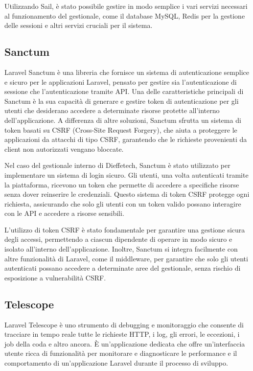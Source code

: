 Utilizzando Sail, è stato possibile gestire in modo semplice i vari servizi necessari al funzionamento del gestionale, come il database MySQL, Redis per la gestione delle sessioni e altri servizi cruciali per il sistema.
\subsection{Sanctum}\label{subsec:cap_sec_subsec_sanctum}
Laravel Sanctum è una libreria che fornisce un sistema di autenticazione semplice e sicuro per le applicazioni Laravel, pensato per gestire sia l’autenticazione di sessione che l’autenticazione tramite API. Una delle caratteristiche principali di Sanctum è la sua capacità di generare e gestire token di autenticazione per gli utenti che desiderano accedere a determinate risorse protette all’interno dell’applicazione. A differenza di altre soluzioni, Sanctum sfrutta un sistema di token basati su CSRF (Cross-Site Request Forgery), che aiuta a proteggere le applicazioni da attacchi di tipo CSRF, garantendo che le richieste provenienti da client non autorizzati vengano bloccate.

Nel caso del gestionale interno di Dieffetech, Sanctum è stato utilizzato per implementare un sistema di login sicuro. Gli utenti, una volta autenticati tramite la piattaforma, ricevono un token che permette di accedere a specifiche risorse senza dover reinserire le credenziali. Questo sistema di token CSRF protegge ogni richiesta, assicurando che solo gli utenti con un token valido possano interagire con le API e accedere a risorse sensibili.

L’utilizzo di token CSRF è stato fondamentale per garantire una gestione sicura degli accessi, permettendo a ciascun dipendente di operare in modo sicuro e isolato all’interno dell’applicazione. Inoltre, Sanctum si integra facilmente con altre funzionalità di Laravel, come il middleware, per garantire che solo gli utenti autenticati possano accedere a determinate aree del gestionale, senza rischio di esposizione a vulnerabilità CSRF.
\subsection{Telescope}\label{subsec:cap_sec_subsec_telescope}
Laravel Telescope è uno strumento di debugging e monitoraggio che consente di tracciare in tempo reale tutte le richieste HTTP, i log, gli errori, le eccezioni, i job della coda e altro ancora. È un'applicazione dedicata che offre un'interfaccia utente ricca di funzionalità per monitorare e diagnosticare le performance e il comportamento di un'applicazione Laravel durante il processo di sviluppo.

